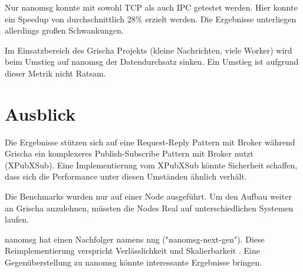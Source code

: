 \documentclass{article}
\begin{document}
Nur nanomsg konnte mit sowohl TCP als auch IPC getestet werden. Hier
konnte ein Speedup von durchschnittlich 28\% erzielt werden. Die
Ergebnisse unterliegen allerdings großen Schwankungen.

Im Einsatzbereich des Grischa Projekts (kleine Nachrichten, viele
Worker) wird beim Umstieg auf nanomsg der Datendurchsatz sinken. Ein
Umstieg ist aufgrund dieser Metrik nicht Ratsam.

\section{Ausblick}

Die Ergebnisse stützen sich auf eine Request-Reply Pattern mit Broker
während Grischa ein komplexeres Publish-Subscribe Pattern 
mit Broker nutzt (XPubXSub). Eine Implementierung vom XPubXSub
könnte Sicherheit schaffen, dass sich die Performance unter
diesen Umständen ähnlich verhält. 

Die Benchmarks wurden nur auf einer Node ausgeführt. Um 
den Aufbau weiter an Grischa anzulehnen, müssten die Nodes 
Real auf unterschiedlichen Systemen laufen.

nanomsg hat einen Nachfolger namens nng ("nanomsg-next-gen"). Diese Reimplementierung verspricht 
Verlässlichkeit und Skalierbarkeit \cite{noauthor_nanomsgnng_2021}. Eine Ge\-gen\-ü\-ber\-stell\-ung
zu nanomsg könnte interessante Ergebnisse bringen.
\clearpage




\listoffigures
\end{document}
